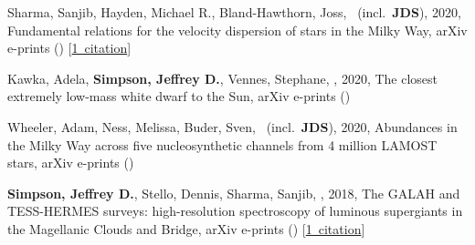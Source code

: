 \item[{\color{numcolor}\scriptsize4}] Sharma, Sanjib, Hayden, Michael R., Bland-Hawthorn, Joss, \etal\ (incl.\ \textbf{JDS}), 2020, Fundamental relations for the velocity dispersion of stars in the Milky Way, arXiv e-prints () [\href{https://ui.adsabs.harvard.edu/#abs/2020arXiv200406556S}{1~citation}]

\item[{\color{numcolor}\scriptsize3}] Kawka, Adela, \textbf{Simpson, Jeffrey D.}, Vennes, Stephane, \etal, 2020, The closest extremely low-mass white dwarf to the Sun, arXiv e-prints ()

\item[{\color{numcolor}\scriptsize2}] Wheeler, Adam, Ness, Melissa, Buder, Sven, \etal\ (incl.\ \textbf{JDS}), 2020, Abundances in the Milky Way across five nucleosynthetic channels from 4 million LAMOST stars, arXiv e-prints ()

\item[{\color{numcolor}\scriptsize1}] \textbf{Simpson, Jeffrey D.}, Stello, Dennis, Sharma, Sanjib, \etal, 2018, The GALAH and TESS-HERMES surveys: high-resolution spectroscopy of luminous supergiants in the Magellanic Clouds and Bridge, arXiv e-prints () [\href{https://ui.adsabs.harvard.edu/#abs/2018arXiv180405900S}{1~citation}]